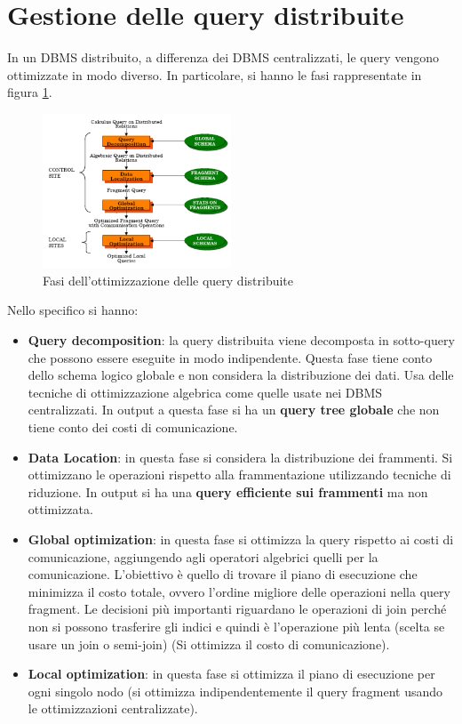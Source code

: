 \section{Gestione delle query distribuite}
In un DBMS distribuito, a differenza dei DBMS centralizzati, le query vengono ottimizzate
in modo diverso. In particolare, si hanno le fasi rappresentate in figura \ref{fig:queryOptimization}.
\begin{figure}[!ht]
      \centering
      \includegraphics[width=0.5\textwidth]{./img/DDBMS/query.png}
      \caption{Fasi dell'ottimizzazione delle query distribuite}
      \label{fig:queryOptimization}
\end{figure}
Nello specifico si hanno:
\begin{itemize}
      \item \textbf{Query decomposition}: la query distribuita viene decomposta in
            sotto-query che possono essere eseguite in modo indipendente. Questa
            fase tiene conto dello schema logico globale e non considera la
            distribuzione dei dati. Usa delle tecniche di ottimizzazione algebrica
            come quelle usate nei DBMS centralizzati.
            In output a questa fase si ha un \textbf{query tree globale} che non tiene
            conto dei costi di comunicazione.
      \item \textbf{Data Location}: in questa fase si considera la distribuzione
            dei frammenti. Si ottimizzano le operazioni rispetto alla
            frammentazione utilizzando tecniche di riduzione. In output si ha una
            \textbf{query efficiente sui frammenti} ma non ottimizzata.
      \item \textbf{Global optimization}: in questa fase si ottimizza la query
            rispetto ai costi di comunicazione, aggiungendo agli operatori
            algebrici quelli per la comunicazione. L'obiettivo è quello di
            trovare il piano di esecuzione che minimizza il costo totale, ovvero
            l'ordine migliore delle operazioni nella query fragment. Le
            decisioni più importanti riguardano le operazioni di join perché
            non si possono trasferire gli indici e quindi è l'operazione più lenta
            (scelta se usare un join o semi-join) (Si ottimizza il costo di comunicazione).
      \item \textbf{Local optimization}: in questa fase si ottimizza il piano di
            esecuzione per ogni singolo nodo (si ottimizza indipendentemente il
            query fragment usando le ottimizzazioni centralizzate).
\end{itemize}
